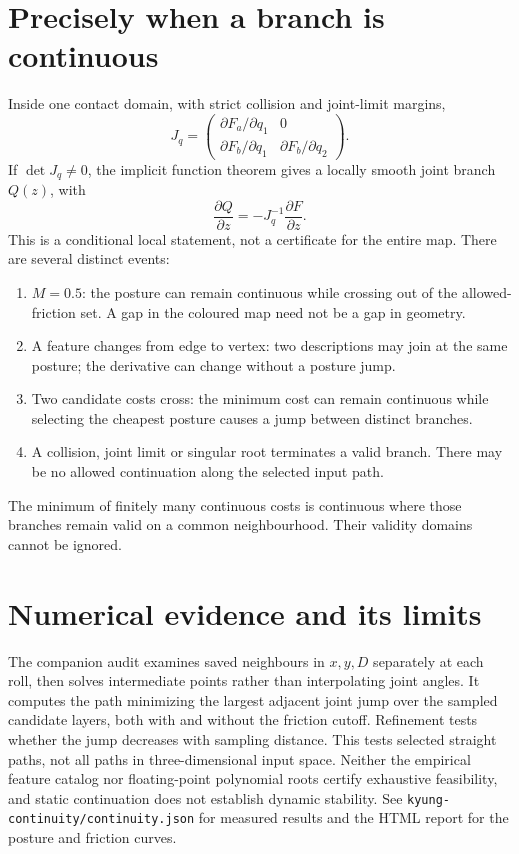 \documentclass[11pt]{article}
\begin{document}
\section{Precisely when a branch is continuous}
Inside one contact domain, with strict collision and joint-limit margins,
\[
 J_q=
 \begin{pmatrix}
 \partial F_a/\partial q_1&0\\
 \partial F_b/\partial q_1&\partial F_b/\partial q_2
 \end{pmatrix}.
\]
If $\det J_q\ne0$, the implicit function theorem gives a locally smooth joint
branch $Q(z)$, with
\[
 \frac{\partial Q}{\partial z}=-J_q^{-1}\frac{\partial F}{\partial z}.
\]
This is a conditional local statement, not a certificate for the entire map.
There are several distinct events:
\begin{enumerate}
\item $M=0.5$: the posture can remain continuous while crossing out of the
allowed-friction set. A gap in the coloured map need not be a gap in geometry.
\item A feature changes from edge to vertex: two descriptions may join at the
same posture; the derivative can change without a posture jump.
\item Two candidate costs cross: the minimum cost can remain continuous while
selecting the cheapest posture causes a jump between distinct branches.
\item A collision, joint limit or singular root terminates a valid branch.
There may be no allowed continuation along the selected input path.
\end{enumerate}
The minimum of finitely many continuous costs is continuous where those branches
remain valid on a common neighbourhood. Their validity domains cannot be ignored.

\section{Numerical evidence and its limits}
The companion audit examines saved neighbours in $x,y,D$ separately at each roll,
then solves intermediate points rather than interpolating joint angles.
It computes the path minimizing the largest adjacent joint jump over the sampled
candidate layers, both with and without the friction cutoff. Refinement tests
whether the jump decreases with sampling distance.
This tests selected straight paths, not all paths in three-dimensional input space.
Neither the empirical feature catalog nor floating-point polynomial roots certify
exhaustive feasibility, and static continuation does not establish dynamic stability.
See \texttt{kyung-continuity/continuity.json} for measured results and the HTML
report for the posture and friction curves.
\end{document}
